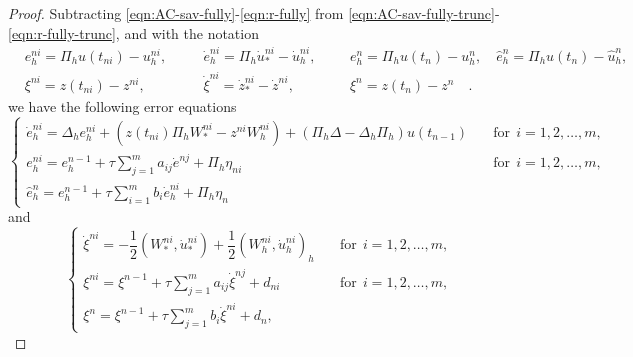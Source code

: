 \begin{proof}
Subtracting \eqref{eqn:AC-sav-fully}-\eqref{eqn:r-fully} from \eqref{eqn:AC-sav-fully-trunc}-\eqref{eqn:r-fully-trunc},
and with the notation
\begin{align*}
  &e_h^{ni} = \Pi_h u(t_{ni}) - u_h^{ni},\quad  &&\dot e_h^{ni} = \Pi_h \dot u_*^{ni} - \dot u_h^{ni},
 &&&  e_h^{n} = \Pi_h u(t_n) - u_h^{n},  \quad  \hat e_h^{n} = \Pi_h u(t_n) - \hat u_h^{n},  \\
 & \xi^{ni} = z(t_{ni}) - z^{ni}, \quad  && \dot \xi^{ni} = \dot z_*^{ni} - \dot z^{ni} ,  &&&  \xi^{n} = z(t_n)- z^n\quad  .
\end{align*}
 we have the following error equations
\begin{equation}\label{eqn:AC-sav-fully-err}
    \begin{cases}
   \dot e_h^{ni} =  \Delta_h e_h^{ni} +  (z(t_{ni}) \Pi_h W_*^{ni} - z^{ni} W_h^{ni}) + (\Pi_h \Delta - \Delta_h \Pi_h) u(t_{n-1})
   &\quad \text{for} ~~i=1,2,\dots,m, \\
   e_h^{ni}=  e_h^{n-1}  + \tau \sum_{j=1}^m a_{ij} \dot e^{nj} + \Pi_h \eta_{ni}&\quad \text{for} ~~i=1,2,\dots,m, \\
 \hat e_h^{n} = e_h^{n-1} + \tau \sum_{i=1}^m b_i \dot e_h^{ni} + \Pi_h \eta_{n}
  \end{cases}
\end{equation}
and
\begin{equation}\label{eqn:r-fully-err}
\begin{cases}
    \dot \xi^{ni} = - \dfrac12(W_*^{ni} ,   \dot u_*^{ni}) + \dfrac12(W_h^{ni} ,   \dot u_h^{ni})_h &\quad \text{for} ~~i=1,2,\dots,m, \\
    \xi^{ni} = \xi^{n-1} + \tau \sum_{j=1}^m a_{ij}  \dot \xi^{nj}+ d_{ni}&\quad \text{for} ~~i=1,2,\dots,m, \\
   \xi^n =\xi^{n-1}  +  \tau \sum_{j=1}^m  b_i  \dot \xi^{ni}+d_{n},
 \end{cases}
\end{equation}


\end{proof}
